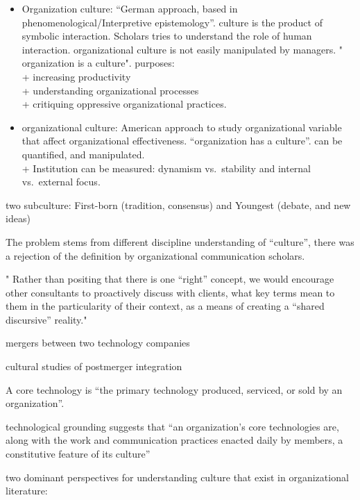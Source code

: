 \documentclass[
]{book}
\providecommand{\tightlist}{%
  \setlength{\itemsep}{0pt}\setlength{\parskip}{0pt}}
\begin{document}
\begin{itemize}
\tightlist
\item
  Organization culture: ``German approach, based in phenomenological/Interpretive epistemology''. culture is the product of symbolic interaction. Scholars tries to understand the role of human interaction. organizational culture is not easily manipulated by managers. " organization is a culture". purposes:\\
  + increasing productivity\\
  + understanding organizational processes\\
  + critiquing oppressive organizational practices.
\item
  organizational culture: American approach to study organizational variable that affect organizational effectiveness. ``organization has a culture''. can be quantified, and manipulated.\\
  + Institution can be measured: dynamism vs.~stability and internal vs.~external focus.
\end{itemize}

two subculture: First-born (tradition, consensus) and Youngest (debate, and new ideas)

The problem stems from different discipline understanding of ``culture'', there was a rejection of the definition by organizational communication scholars.

" Rather than positing that there is one ``right'' concept, we would encourage other consultants to proactively discuss with clients, what key terms mean to them in the particularity of their context, as a means of creating a ``shared discursive'' reality."

\citep{Leonardi_2008}
mergers between two technology companies

cultural studies of postmerger integration

A core technology is ``the primary technology produced, serviced, or sold by an organization''.

technological grounding suggests that ``an organization's core technologies are, along with the work and communication practices enacted daily by members, a constitutive feature of its culture''

two dominant perspectives for understanding culture that exist in organizational literature:
\end{document}
